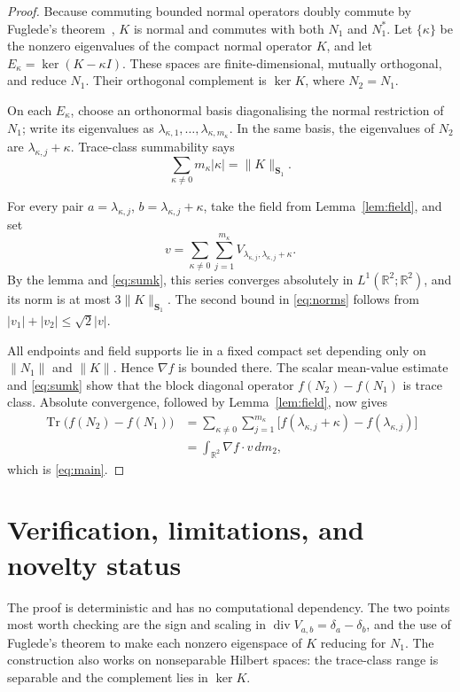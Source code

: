 \documentclass[11pt]{article}
\newcommand{\R}{\mathbb R}
\newcommand{\Sone}{\boldsymbol S_1}
\newcommand{\Tr}{\operatorname{Tr}}
\newcommand{\diver}{\operatorname{div}}
\begin{document}
\begin{proof}
Because commuting bounded normal operators doubly commute by Fuglede's
theorem~\cite{Fuglede}, \(K\) is normal and commutes with both \(N_1\) and
\(N_1^*\).  Let \(\{\kappa\}\) be the nonzero eigenvalues of the compact
normal operator \(K\), and let \(E_\kappa=\ker(K-\kappa I)\).  These spaces
are finite-dimensional, mutually orthogonal, and reduce \(N_1\).  Their
orthogonal complement is \(\ker K\), where \(N_2=N_1\).

On each \(E_\kappa\), choose an orthonormal basis diagonalising the normal
restriction of \(N_1\); write its eigenvalues as
\(\lambda_{\kappa,1},\ldots,\lambda_{\kappa,m_\kappa}\).  In the same basis,
the eigenvalues of \(N_2\) are
\(\lambda_{\kappa,j}+\kappa\).  Trace-class summability says
\begin{equation}\label{eq:sumk}
 \sum_{\kappa\ne0}m_\kappa|\kappa|=\|K\|_{\Sone}.
\end{equation}

For every pair
\(a=\lambda_{\kappa,j}\), \(b=\lambda_{\kappa,j}+\kappa\), take the field
from Lemma~\ref{lem:field}, and set
\[
 v=\sum_{\kappa\ne0}\sum_{j=1}^{m_\kappa}
 V_{\lambda_{\kappa,j},\lambda_{\kappa,j}+\kappa}.
\]
By the lemma and \eqref{eq:sumk}, this series converges absolutely in
\(L^1(\R^2;\R^2)\), and its norm is at most \(3\|K\|_{\Sone}\).  The second
bound in \eqref{eq:norms} follows from
\(|v_1|+|v_2|\leq\sqrt2|v|\).

All endpoints and field supports lie in a fixed compact set depending only on
\(\|N_1\|\) and \(\|K\|\).  Hence \(\nabla f\) is bounded there.  The scalar
mean-value estimate and \eqref{eq:sumk} show that the block diagonal operator
\(f(N_2)-f(N_1)\) is trace class.  Absolute convergence, followed by
Lemma~\ref{lem:field}, now gives
\begin{align*}
 \Tr\bigl(f(N_2)-f(N_1)\bigr)
 &=\sum_{\kappa\ne0}\sum_{j=1}^{m_\kappa}
 \bigl[f(\lambda_{\kappa,j}+\kappa)-f(\lambda_{\kappa,j})\bigr]\\
 &=\int_{\R^2}\nabla f\mathbin{\cdot}v\,dm_2,
\end{align*}
which is \eqref{eq:main}.
\end{proof}

\section{Verification, limitations, and novelty status}

The proof is deterministic and has no computational dependency.  The two
points most worth checking are the sign and scaling in
\(\diver V_{a,b}=\delta_a-\delta_b\), and the use of Fuglede's theorem to make
each nonzero eigenspace of \(K\) reducing for \(N_1\).  The construction also
works on nonseparable Hilbert spaces: the trace-class range is separable and
the complement lies in \(\ker K\).
\end{document}
